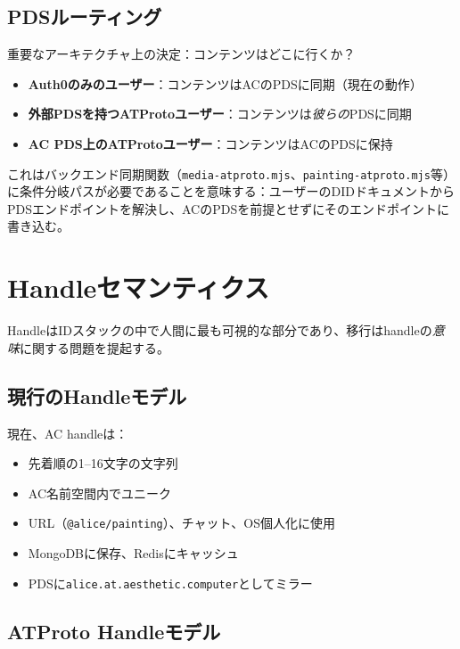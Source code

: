 \documentclass[10pt,letterpaper,twocolumn]{article}
\begin{document}
\subsection{PDSルーティング}

重要なアーキテクチャ上の決定：コンテンツはどこに行くか？

\begin{itemize}
  \item \textbf{Auth0のみのユーザー}：コンテンツはACのPDSに同期（現在の動作）
  \item \textbf{外部PDSを持つATProtoユーザー}：コンテンツは\emph{彼らの}PDSに同期
  \item \textbf{AC PDS上のATProtoユーザー}：コンテンツはACのPDSに保持
\end{itemize}

これはバックエンド同期関数（\texttt{media-atproto.mjs}、\texttt{painting-atproto.mjs}等）に条件分岐パスが必要であることを意味する：ユーザーのDIDドキュメントからPDSエンドポイントを解決し、ACのPDSを前提とせずにそのエンドポイントに書き込む。


\section{Handleセマンティクス}
\label{sec:handles}

HandleはIDスタックの中で人間に最も可視的な部分であり、移行はhandleの\emph{意味}に関する問題を提起する。

\subsection{現行のHandleモデル}

現在、AC handleは：
\begin{itemize}
  \item 先着順の1--16文字の文字列
  \item AC名前空間内でユニーク
  \item URL（\texttt{@alice/painting}）、チャット、OS個人化に使用
  \item MongoDBに保存、Redisにキャッシュ
  \item PDSに\texttt{alice.at.aesthetic.computer}としてミラー
\end{itemize}

\subsection{ATProto Handleモデル}
\end{document}
